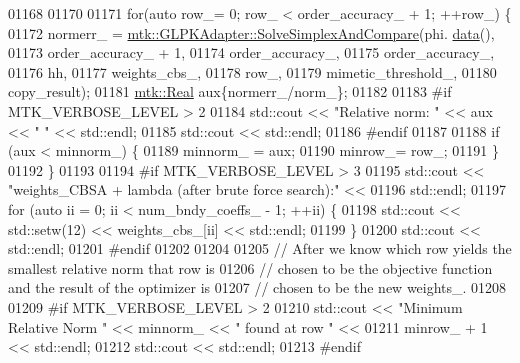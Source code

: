 \begin{DoxyCode}
{{01168 
01170 
01171     \textcolor{keywordflow}{for}(\textcolor{keyword}{auto} row\_= 0; row\_ < order\_accuracy\_ + 1; ++row\_) \{
01172       normerr\_ = \hyperlink{classmtk_1_1GLPKAdapter_a834480aca83e3c0d09fdab7fdb7e8a3f}{mtk::GLPKAdapter::SolveSimplexAndCompare}(phi.
      \hyperlink{classmtk_1_1DenseMatrix_a0c33b8a9e01d157c61ddbdf807c25d84}{data}(),
01173                                                           order\_accuracy\_ + 1,
01174                                                           order\_accuracy\_,
01175                                                           order\_accuracy\_,
01176                                                           hh,
01177                                                           weights\_cbs\_,
01178                                                           row\_,
01179                                                           mimetic\_threshold\_,
01180                                                           copy\_result);
01181       \hyperlink{group__c01-roots_gac080bbbf5cbb5502c9f00405f894857d}{mtk::Real} aux\{normerr\_/norm\_\};
01182 
01183 \textcolor{preprocessor}{      #if MTK\_VERBOSE\_LEVEL > 2}
01184       std::cout << \textcolor{stringliteral}{"Relative norm: "} << aux << \textcolor{stringliteral}{" "} << std::endl;
01185       std::cout << std::endl;
01186 \textcolor{preprocessor}{      #endif}
01187 
01188       \textcolor{keywordflow}{if} (aux < minnorm\_) \{
01189         minnorm\_ = aux;
01190         minrow\_= row\_;
01191       \}
01192     \}
01193 
01194 \textcolor{preprocessor}{    #if MTK\_VERBOSE\_LEVEL > 3}
01195     std::cout << \textcolor{stringliteral}{"weights\_CBSA + lambda (after brute force search):"} <<
01196       std::endl;
01197     \textcolor{keywordflow}{for} (\textcolor{keyword}{auto} ii = 0; ii < num\_bndy\_coeffs\_ - 1; ++ii) \{
01198       std::cout << std::setw(12) << weights\_cbs\_[ii] << std::endl;
01199     \}
01200     std::cout << std::endl;
01201 \textcolor{preprocessor}{    #endif}
01202 
01204 
01205     \textcolor{comment}{// After we know which row yields the smallest relative norm that row is}
01206     \textcolor{comment}{// chosen to be the objective function and the result of the optimizer is}
01207     \textcolor{comment}{// chosen to be the new weights\_.}
01208 
01209 \textcolor{preprocessor}{    #if MTK\_VERBOSE\_LEVEL > 2}
01210     std::cout << \textcolor{stringliteral}{"Minimum Relative Norm "} << minnorm\_ << \textcolor{stringliteral}{" found at row "} <<
01211       minrow\_ + 1 << std::endl;
01212     std::cout << std::endl;
01213 \textcolor{preprocessor}{    #endif}
}}
\end{DoxyCode}
